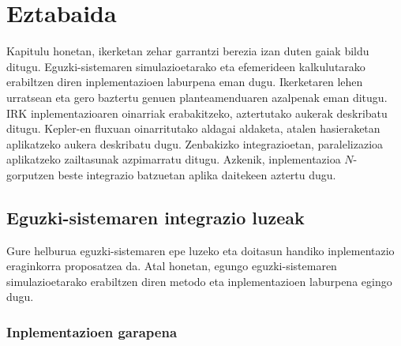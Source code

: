 \chapter{Eztabaida}


Kapitulu honetan, ikerketan zehar garrantzi berezia izan duten gaiak bildu ditugu. Eguzki-sistemaren simulazioetarako eta efemerideen kalkulutarako erabiltzen diren inplementazioen laburpena eman dugu. Ikerketaren lehen urratsean eta gero baztertu genuen planteamenduaren azalpenak eman ditugu. IRK inplementazioaren oinarriak erabakitzeko, aztertutako aukerak deskribatu ditugu. Kepler-en fluxuan oinarritutako aldagai aldaketa, atalen hasieraketan aplikatzeko aukera deskribatu dugu. Zenbakizko integrazioetan, paralelizazioa aplikatzeko zailtasunak azpimarratu ditugu. Azkenik, inplementazioa $N$-gorputzen beste integrazio batzuetan aplika daitekeen aztertu dugu.   


\section{Eguzki-sistemaren integrazio luzeak}


Gure helburua eguzki-sistemaren epe luzeko eta doitasun handiko inplementazio eraginkorra proposatzea da. Atal honetan, egungo eguzki-sistemaren simulazioetarako erabiltzen diren metodo eta inplementazioen laburpena egingo dugu. 

\subsection*{Inplementazioen garapena} 

